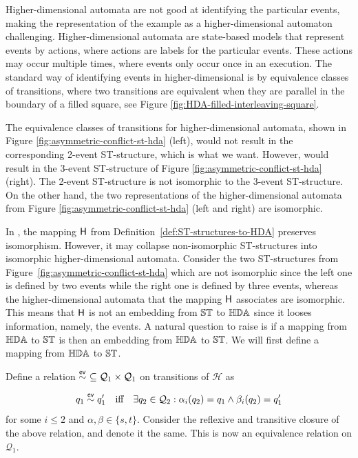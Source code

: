 \begin{example}
        Higher-dimensional automata are not good at identifying the particular events, making the representation of the example as a higher-dimensional automaton challenging. Higher-dimensional automata are state-based models that represent events by actions, where actions are labels for the particular events. These actions may occur multiple times, where events only occur once in an execution. The standard way of identifying events in higher-dimensional is by equivalence classes of transitions, where two transitions are equivalent when they are parallel in the boundary of a filled square, see Figure \ref{fig:HDA-filled-interleaving-square}.
    
        The equivalence classes of transitions for higher-dimensional automata, shown in Figure \ref{fig:asymmetric-conflict-st-hda} (left), would not result in the corresponding 2-event ST-structure, which is what we want. However, would result in the 3-event ST-structure of Figure \ref{fig:asymmetric-conflict-st-hda} (right). The 2-event ST-structure is not isomorphic to the 3-event ST-structure. On the other hand, the two representations of the higher-dimensional automata from Figure \ref{fig:asymmetric-conflict-st-hda} (left and right) are isomorphic.
    \end{example}
    
    In \cite[Proposition 3.39]{Johansen16STstruct}, the mapping $\mathsf{H}$ from Definition~\ref{def:ST-structures-to-HDA} preserves isomorphism. However, it may collapse non-isomorphic ST-structures into isomorphic higher-dimensional automata. Consider the two ST-structures from Figure~\ref{fig:asymmetric-conflict-st-hda} which are not isomorphic since the left one is defined by two events while the right one is defined by three events, whereas the higher-dimensional automata that the mapping $\mathsf{H}$ associates are isomorphic. This means that $\mathsf{H}$ is not an embedding from $\mathbb{ST}$ to $\mathbb{HDA}$ since it looses information, namely, the events. A natural question to raise is if a mapping from $\mathbb{HDA}$ to $\mathbb{ST}$ is then an embedding from $\mathbb{HDA}$ to $\mathbb{ST}$. We will first define a mapping from $\mathbb{HDA}$ to $\mathbb{ST}$.
    
    \begin{definition}
        \label{def:events-equivalence-relation-of-HDA}
        Define a relation $\stackrel{\mathsf{ev}}{\sim}\ \subseteq \mathcal{Q}_{1}\times \mathcal{Q}_{1}$ on transitions of $\mathcal{H}$ as 
        
        \[
            q_{1}\stackrel{\mathsf{ev}}{\sim} q_{1}' \quad\text{iff}\quad \exists q_{2}\in
            \mathcal{Q}_{2}:\alpha_{i}(q_{2})=q_{1}\wedge \beta_{i}(q_{2})=q_{1}'
        \]
        for some $i\leq 2$ and $\alpha,\beta\in\{s,t\}$.  Consider the reflexive and transitive closure of the above relation, and denote it the same. This is now an equivalence relation on $\mathcal{Q}_{1}$.
    \end{definition}
    


